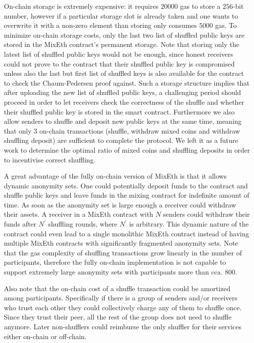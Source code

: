 \documentclass[conference, compsoc]{IEEEtran}
\theoremstyle{definition}
\begin{document}
On-chain storage is extremely expensive: it requires $\num[group-separator={,}]{20000}$ gas to store a $256$-bit number, however if a particular storage slot is already taken and one wants to overwrite it with a non-zero element than storing only consumes $\num[group-separator={,}]{5000}$ gas. To minimize on-chain storage costs, only the last two list of shuffled public keys are stored in the MixEth contract's permanent storage. Note that storing only the latest list of shuffled public keys would not be enough, since honest receivers could not prove to the contract that their shuffled public key is compromised unless also the last but first list of shuffled keys is also available for the contract to check the Chaum-Pedersen proof against. Such a storage structure implies that after uploading the new list of shuffled public keys, a challenging period should proceed in order to let receivers check the correctness of the shuffle and whether their shuffled public key is stored in the smart contract. Furthermore we also allow senders to shuffle and deposit new public keys at the same time, meaning that only $3$ on-chain transactions (shuffle, withdraw mixed coins and withdraw shuffling deposit) are sufficient to complete the protocol. We left it as a future work to determine the optimal ratio of mixed coins and shuffling deposits in order to incentivise correct shuffling.

A great advantage of the fully on-chain version of MixEth is that it allows dynamic anonymity sets. One could potentially deposit funds to the contract and shuffle public keys and leave funds in the mixing contract for indefinite amount of time. As soon as the anonymity set is large enough a receiver could withdraw their assets. A receiver in a MixEth contract with $N$ senders could withdraw their funds after $N^{'}$ shuffling rounds, where $N^{'}$ is arbitrary. This dynamic nature of the contract could even lead to a single monolithic MixEth contract instead of having multiple MixEth contracts with significantly fragmented anonymity sets. Note that the gas complexity of shuffling transactions grow linearly in the number of participants, therefore the fully on-chain implementation is not capable to support extremely large anonymity sets with participants more than cca. $\num[group-separator={,}]{800}$. 

Also note that the on-chain cost of a shuffle transaction could be amortized among participants. Specifically if there is a group of senders and/or receivers who trust each other they could collectively charge any of them to shuffle once. Since they trust their peer, all the rest of the group does not need to shuffle anymore. Later non-shufflers could reimburse the only shuffler for their services either on-chain or off-chain. 
\end{document}
